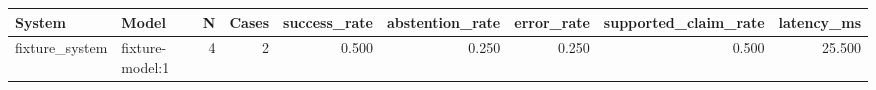 \begin{tabular}{llrrrrrrr}
\toprule
System & Model & N & Cases & success\_rate & abstention\_rate & error\_rate & supported\_claim\_rate & latency\_ms \\
\midrule
fixture\_system & fixture-model:1 & 4 & 2 & 0.500 & 0.250 & 0.250 & 0.500 & 25.500 \\
\bottomrule
\end{tabular}
